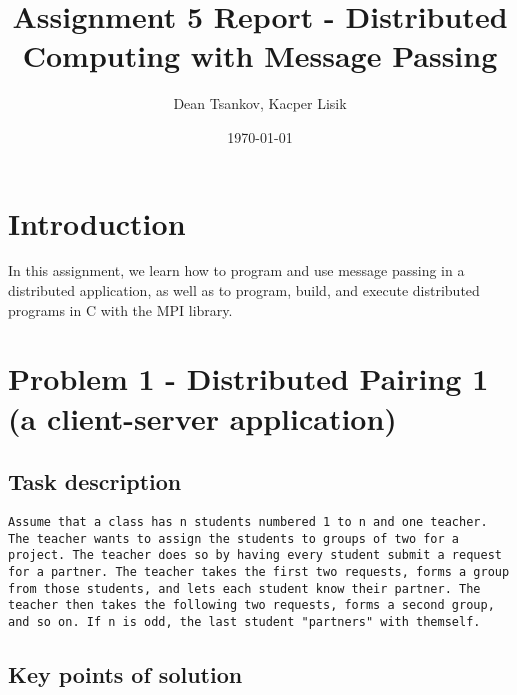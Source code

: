 \documentclass[a4paper,11pt]{article}
\begin{document}
\title{
    \textbf{Assignment 5 Report - Distributed Computing with Message Passing}
}
\author{Dean Tsankov, Kacper Lisik}
\date{\today}

\maketitle

\section*{Introduction}

In this assignment, we learn how to program and use message passing in a distributed application, as well as to program, build, and execute distributed programs in C with the MPI library.

\section*{Problem 1 - Distributed Pairing 1 (a client-server application)}

\subsection*{Task description}

\begin{verbatim}
Assume that a class has n students numbered 1 to n and one teacher. The teacher wants to assign the students to groups of two for a project. The teacher does so by having every student submit a request for a partner. The teacher takes the first two requests, forms a group from those students, and lets each student know their partner. The teacher then takes the following two requests, forms a second group, and so on. If n is odd, the last student "partners" with themself.

\end{verbatim}


\subsection*{Key points of solution}
\end{document}
